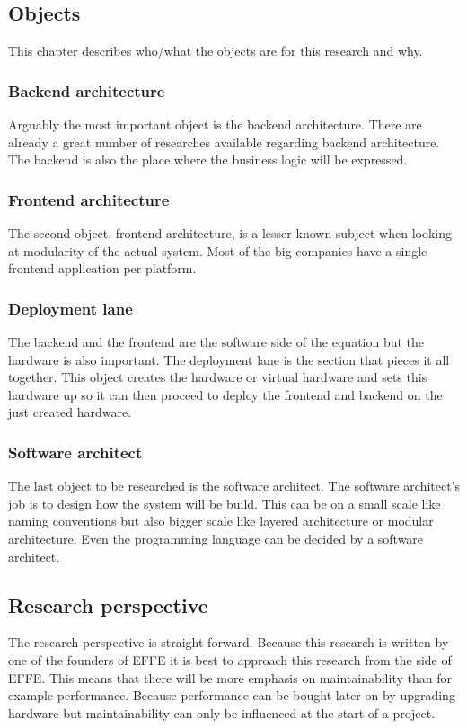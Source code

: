 \subsection{Objects}
This chapter describes who/what the objects are for this research and why.

\subsubsection{Backend architecture}
Arguably the most important object is the backend architecture. There are already a great number of researches available regarding backend architecture. The backend is also the place where the business logic will be expressed.

\subsubsection{Frontend architecture}
The second object, frontend architecture, is a lesser known subject when looking at modularity of the actual system. Most of the big companies have a single frontend application per platform.

\subsubsection{Deployment lane}
\label{sec:DeploymentLane}
The backend and the frontend are the software side of the equation but the hardware is also important. The deployment lane is the section that pieces it all together. This object creates the hardware or virtual hardware and sets this hardware up so it can then proceed to deploy the frontend and backend on the just created hardware.

\subsubsection{Software architect}
\label{sec:SoftwareArchitect}
The last object to be researched is the software architect. The software architect's job is to design how the system will be build. This can be on a small scale like naming conventions but also bigger scale like layered architecture or modular architecture. Even the programming language can be decided by a software architect.

\subsection{Research perspective}
The research perspective is straight forward. Because this research is written by one of the founders of EFFE it is best to approach this research from the side of EFFE. This means that there will be more emphasis on maintainability than for example performance. Because performance can be bought later on by upgrading hardware but maintainability can only be influenced at the start of a project.

